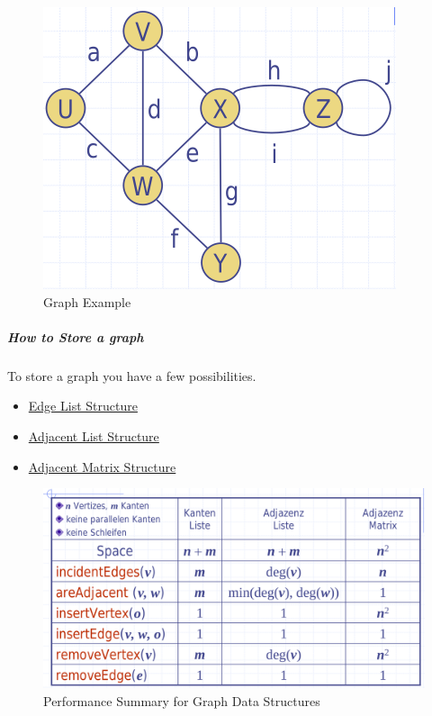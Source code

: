\documentclass[11pt,twoside,twocolumn,landscape]{article}
\begin{document}
\begin{figure}[htbp]
\centering
\includegraphics[width=.9\linewidth]{img/graph_example.png}
\caption{\label{fig:orgfe22f96}Graph Example}
\end{figure}

\subparagraph{How to Store a graph}
\label{sec:orge2b198c}

To store a graph you have a few possibilities.
\begin{itemize}
\item \href{../../../roam/20220201173524-edge_list_structure.org}{Edge List Structure}
\item \href{../../../roam/20220201180442-adjacent_list_structure.org}{Adjacent List Structure}
\item \href{../../../roam/20220201180955-adjacent_matrix_structure.org}{Adjacent Matrix Structure}
\end{itemize}


\begin{figure}[htbp]
\centering
\includegraphics[width=.9\linewidth]{img/graph_data_structure_summary_running_time.png}
\caption{\label{fig:orgd5aae9b}Performance Summary for Graph Data Structures}
\end{figure}
\end{document}

